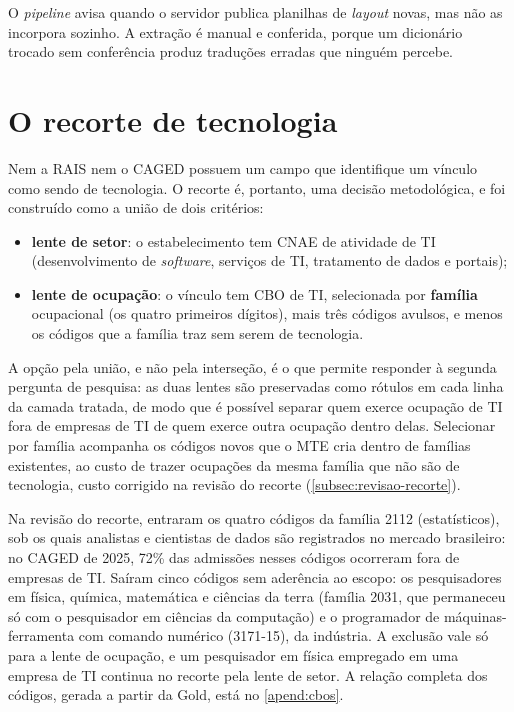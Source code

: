 O \textit{pipeline} avisa quando o servidor publica planilhas de \textit{layout} novas, mas não as incorpora sozinho. A extração é manual e conferida, porque um dicionário trocado sem conferência produz traduções erradas que ninguém percebe.

\section{O recorte de tecnologia}
\label{sec:recorte}

Nem a RAIS nem o CAGED possuem um campo que identifique um vínculo como sendo de tecnologia. O recorte é, portanto, uma decisão metodológica, e foi construído como a união de dois critérios:

\begin{itemize}
    \item \textbf{lente de setor}: o estabelecimento tem CNAE de atividade de TI (desenvolvimento de \textit{software}, serviços de TI, tratamento de dados e portais);
    \item \textbf{lente de ocupação}: o vínculo tem CBO de TI, selecionada por \textbf{família} ocupacional (os quatro primeiros dígitos), mais três códigos avulsos, e menos os códigos que a família traz sem serem de tecnologia.
\end{itemize}

A opção pela união, e não pela interseção, é o que permite responder à segunda pergunta de pesquisa: as duas lentes são preservadas como rótulos em cada linha da camada tratada, de modo que é possível separar quem exerce ocupação de TI fora de empresas de TI de quem exerce outra ocupação dentro delas. Selecionar por família acompanha os códigos novos que o MTE cria dentro de famílias existentes, ao custo de trazer ocupações da mesma família que não são de tecnologia, custo corrigido na revisão do recorte (\autoref{subsec:revisao-recorte}).

\label{subsec:revisao-recorte}
Na revisão do recorte, entraram os quatro códigos da família 2112 (estatísticos), sob os quais analistas e cientistas de dados são registrados no mercado brasileiro: no CAGED de 2025, 72\% das admissões nesses códigos ocorreram fora de empresas de TI. Saíram cinco códigos sem aderência ao escopo: os pesquisadores em física, química, matemática e ciências da terra (família 2031, que permaneceu só com o pesquisador em ciências da computação) e o programador de máquinas-ferramenta com comando numérico (3171-15), da indústria. A exclusão vale só para a lente de ocupação, e um pesquisador em física empregado em uma empresa de TI continua no recorte pela lente de setor. A relação completa dos códigos, gerada a partir da Gold, está no \autoref{apend:cbos}.

